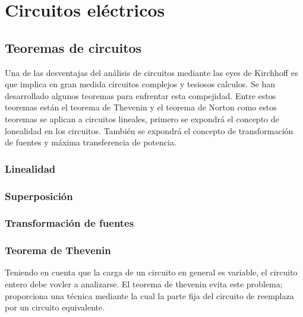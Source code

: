 \chapter{Circuitos eléctricos}


\section{Teoremas de circuitos}


Una de las desventajas del análisis de circuitos mediante las eyes de Kirchhoff es que implica en gran medida circuitos complejos y tesiosos calculos. Se han desarrollado algunos teoremas para enfrentar esta compejidad. Entre estos teoremas están el teorema de Thevenin y el teorema de Norton como estos teoremas se aplican a circuitos lineales, primero se expondrá el concepto de lonealidad en los circuitos. También se expondrá el concepto de transformación de fuentes y máxima transferencia de potencia.

\subsection{Linealidad}



\subsection{Superposición}



\subsection{Transformación de fuentes}


\subsection{Teorema de Thevenin}

Teniendo en cuenta que la carga de un circuito en general es variable, el circuito entero debe vovler a analizarse. El teorema de thevenin evita este problema; proporciona una técnica mediante la cual la parte fija del circuito de reemplaza por un circuito equivalente. 

